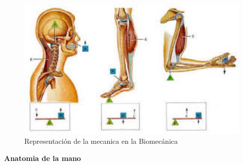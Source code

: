 \documentclass{article}
\begin{document}
\begin{figure} [htp]%
    \centering
    \includegraphics[width=150mm]{biomecanica2.jpg} %
    \caption{Representación de la mecanica en la Biomecánica}
    \label{grafica}
\end{figure}

\cite{ff2}\textbf{Anatomia de la mano} \\
\end{document}
